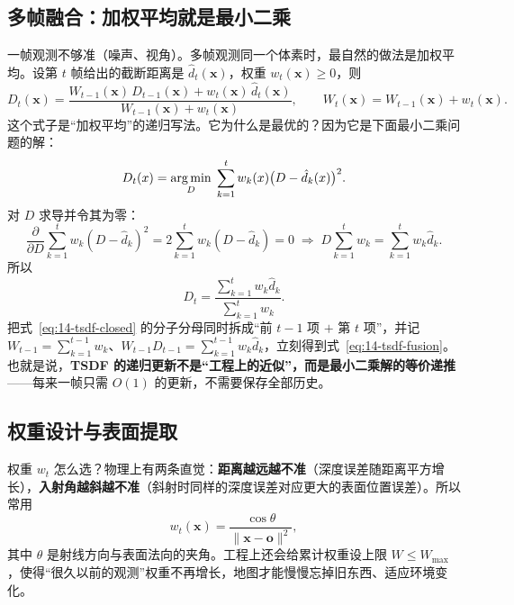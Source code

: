 \subsection{多帧融合：加权平均就是最小二乘}

一帧观测不够准（噪声、视角）。多帧观测同一个体素时，最自然的做法是加权平均。设第 $t$ 帧给出的截断距离是 $\hat d_t(\bm{x})$，权重 $w_t(\bm{x})\ge0$，则
\begin{equation}
D_t(\bm{x})=\frac{W_{t-1}(\bm{x})\,D_{t-1}(\bm{x})+w_t(\bm{x})\,\hat d_t(\bm{x})}
{W_{t-1}(\bm{x})+w_t(\bm{x})},
\qquad
W_t(\bm{x})=W_{t-1}(\bm{x})+w_t(\bm{x}).
\label{eq:14-tsdf-fusion}
\end{equation}
这个式子是``加权平均''的递归写法。它为什么是最优的？因为它是下面最小二乘问题的解：
\begin{equation}
D_t(x)=\operatorname*{arg\,min}_{D}\;\sum_{k=1}^{t}w_k(x)\big(D-\hat d_k(x)\big)^{2}.
\label{eq:14-tsdf-ls}
\end{equation}
对 $D$ 求导并令其为零：
\begin{equation}
\frac{\partial}{\partial D}\sum_{k=1}^{t}w_k(D-\hat d_k)^{2}
=2\sum_{k=1}^{t}w_k(D-\hat d_k)=0
\;\Longrightarrow\;
D\sum_{k=1}^{t}w_k=\sum_{k=1}^{t}w_k\hat d_k .
\end{equation}
所以
\begin{equation}
D_t=\frac{\sum_{k=1}^{t}w_k\hat d_k}{\sum_{k=1}^{t}w_k}.
\label{eq:14-tsdf-closed}
\end{equation}
把式~\eqref{eq:14-tsdf-closed} 的分子分母同时拆成``前 $t-1$ 项 $+$ 第 $t$ 项''，并记 $W_{t-1}=\sum_{k=1}^{t-1}w_k$、$W_{t-1}D_{t-1}=\sum_{k=1}^{t-1}w_k\hat d_k$，立刻得到式~\eqref{eq:14-tsdf-fusion}。也就是说，\textbf{TSDF 的递归更新不是``工程上的近似''，而是最小二乘解的等价递推}——每来一帧只需 $O(1)$ 的更新，不需要保存全部历史。

\subsection{权重设计与表面提取}

权重 $w_t$ 怎么选？物理上有两条直觉：\textbf{距离越远越不准}（深度误差随距离平方增长），\textbf{入射角越斜越不准}（斜射时同样的深度误差对应更大的表面位置误差）。所以常用
\begin{equation}
w_t(\bm{x})=\frac{\cos\theta}{\|\bm{x}-\bm{o}\|^{2}},
\end{equation}
其中 $\theta$ 是射线方向与表面法向的夹角。工程上还会给累计权重设上限 $W\le W_{\max}$，使得``很久以前的观测''权重不再增长，地图才能慢慢忘掉旧东西、适应环境变化。

